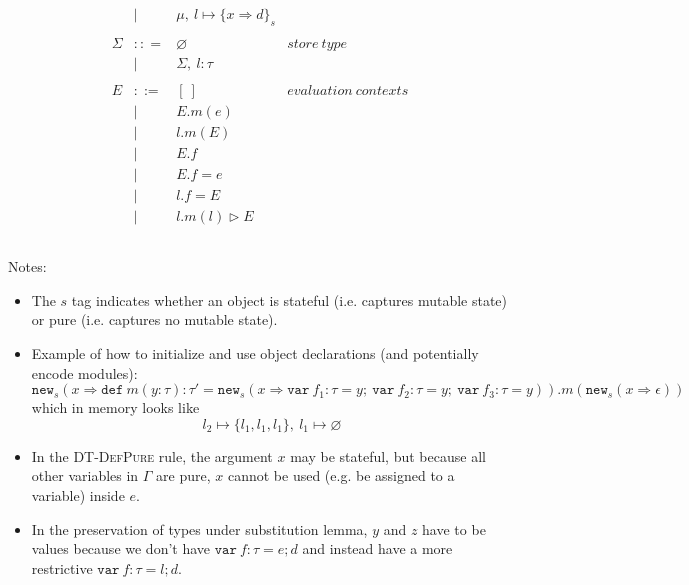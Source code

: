 \documentclass{llncs}
\newcommand{\keywadj}[1]{\mathtt{#1}}
\newcommand{\keyw}[1]{\keywadj{#1}~}
\begin{document}
\[\begin{array}{lll}
\begin{array}{lllr}
& | & \mu,~l \mapsto \{ x \Rightarrow d \}_{s}\\
&&\\
\Sigma & :: = & \varnothing & store~type\\
& | & \Sigma,~l : \tau\\
&&\\
E & ::= & [~] & evaluation~ contexts\\
  & |   & E.m(e)\\
  & |   & l.m(E)\\
  & |   & E.f \\
  & |   & E.f = e \\
  & |   & l.f = E \\
  & |   & l.m(l) \rhd E \\
&&\\
\end{array}
\end{array}
\]

\noindent Notes:

\begin{itemize}
\item The $s$ tag indicates whether an object is stateful (i.e. captures mutable state) or pure (i.e. captures no mutable state).
\item Example of how to initialize and use object declarations (and potentially encode modules):
\[
\keywadj{new}_{s}(x \Rightarrow \keyw{def} m(y : \tau) : \tau' = \keywadj{new}_{s}(x \Rightarrow \keyw{var} f_1 : \tau = y;~\keyw{var} f_2 : \tau = y;~\keyw{var} f_3 : \tau = y)).m(\keywadj{new}_{s} (x \Rightarrow \epsilon))
\]
which in memory looks like 
\[
l_2 \mapsto \{l_1,l_1,l_1\},~l_1 \mapsto \varnothing
\]
\item In the \textsc{DT-DefPure} rule, the argument $x$ may be stateful, but because all other variables in $\Gamma$ are pure, $x$ cannot be used (e.g. be assigned to a variable) inside $e$.
\item In the preservation of types under substitution lemma, $y$ and $z$ have to be values because we don't have $\keyw{var} f:\tau = e; d$ and instead have a more restrictive $\keyw{var} f:\tau = l;d$.
\end{itemize}
\end{document}
